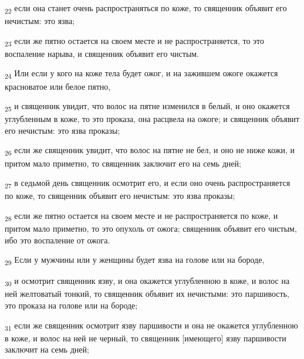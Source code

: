 \begin{tcolorbox}
\textsubscript{22} если она станет очень распространяться по коже, то священник объявит его нечистым: это язва;
\end{tcolorbox}
\begin{tcolorbox}
\textsubscript{23} если же пятно остается на своем месте и не распространяется, то это воспаление нарыва, и священник объявит его чистым.
\end{tcolorbox}
\begin{tcolorbox}
\textsubscript{24} Или если у кого на коже тела будет ожог, и на зажившем ожоге окажется красноватое или белое пятно,
\end{tcolorbox}
\begin{tcolorbox}
\textsubscript{25} и священник увидит, что волос на пятне изменился в белый, и оно окажется углубленным в коже, то это проказа, она расцвела на ожоге; и священник объявит его нечистым: это язва проказы;
\end{tcolorbox}
\begin{tcolorbox}
\textsubscript{26} если же священник увидит, что волос на пятне не бел, и оно не ниже кожи, и притом мало приметно, то священник заключит его на семь дней;
\end{tcolorbox}
\begin{tcolorbox}
\textsubscript{27} в седьмой день священник осмотрит его, и если оно очень распространяется по коже, то священник объявит его нечистым: это язва проказы;
\end{tcolorbox}
\begin{tcolorbox}
\textsubscript{28} если же пятно остается на своем месте и не распространяется по коже, и притом мало приметно, то это опухоль от ожога; священник объявит его чистым, ибо это воспаление от ожога.
\end{tcolorbox}
\begin{tcolorbox}
\textsubscript{29} Если у мужчины или у женщины будет язва на голове или на бороде,
\end{tcolorbox}
\begin{tcolorbox}
\textsubscript{30} и осмотрит священник язву, и она окажется углубленною в коже, и волос на ней желтоватый тонкий, то священник объявит их нечистыми: это паршивость, это проказа на голове или на бороде;
\end{tcolorbox}
\begin{tcolorbox}
\textsubscript{31} если же священник осмотрит язву паршивости и она не окажется углубленною в коже, и волос на ней не черный, то священник [имеющего] язву паршивости заключит на семь дней;
\end{tcolorbox}
